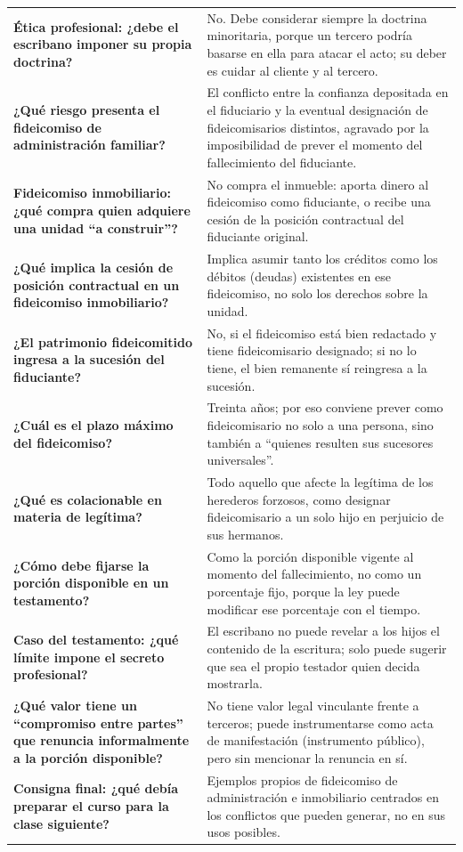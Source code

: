 \documentclass[12pt,oneside]{book}
\begin{document}
\begin{longtable}{
    >{\raggedright\arraybackslash}p{}
    >{\raggedright\arraybackslash}p{}}
\textbf{Ética profesional: ¿debe el escribano imponer su propia doctrina?} &
No. Debe considerar siempre la doctrina minoritaria, porque un tercero podría basarse en ella para atacar el acto; su deber es cuidar al cliente y al tercero. \\
\textbf{¿Qué riesgo presenta el fideicomiso de administración familiar?} &
El conflicto entre la confianza depositada en el fiduciario y la eventual designación de fideicomisarios distintos, agravado por la imposibilidad de prever el momento del fallecimiento del fiduciante. \\
\textbf{Fideicomiso inmobiliario: ¿qué compra quien adquiere una unidad ``a construir''?} &
No compra el inmueble: aporta dinero al fideicomiso como fiduciante, o recibe una cesión de la posición contractual del fiduciante original. \\
\textbf{¿Qué implica la cesión de posición contractual en un fideicomiso inmobiliario?} &
Implica asumir tanto los créditos como los débitos (deudas) existentes en ese fideicomiso, no solo los derechos sobre la unidad. \\
\textbf{¿El patrimonio fideicomitido ingresa a la sucesión del fiduciante?} &
No, si el fideicomiso está bien redactado y tiene fideicomisario designado; si no lo tiene, el bien remanente sí reingresa a la sucesión. \\
\textbf{¿Cuál es el plazo máximo del fideicomiso?} &
Treinta años; por eso conviene prever como fideicomisario no solo a una persona, sino también a ``quienes resulten sus sucesores universales''. \\
\textbf{¿Qué es colacionable en materia de legítima?} &
Todo aquello que afecte la legítima de los herederos forzosos, como designar fideicomisario a un solo hijo en perjuicio de sus hermanos. \\
\textbf{¿Cómo debe fijarse la porción disponible en un testamento?} &
Como la porción disponible vigente al momento del fallecimiento, no como un porcentaje fijo, porque la ley puede modificar ese porcentaje con el tiempo. \\
\textbf{Caso del testamento: ¿qué límite impone el secreto profesional?} &
El escribano no puede revelar a los hijos el contenido de la escritura; solo puede sugerir que sea el propio testador quien decida mostrarla. \\
\textbf{¿Qué valor tiene un ``compromiso entre partes'' que renuncia informalmente a la porción disponible?} &
No tiene valor legal vinculante frente a terceros; puede instrumentarse como acta de manifestación (instrumento público), pero sin mencionar la renuncia en sí. \\
\textbf{Consigna final: ¿qué debía preparar el curso para la clase siguiente?} &
Ejemplos propios de fideicomiso de administración e inmobiliario centrados en los conflictos que pueden generar, no en sus usos posibles. \\
\bottomrule
\end{longtable}
\end{document}
